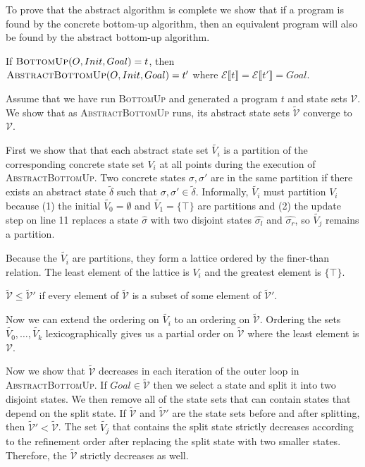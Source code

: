 \documentclass[review]{acmart}
\newcommand{\abs}[1]{\ensuremath{\widetilde{#1}}}
\renewcommand{\eval}[1]{\ensuremath{\mathcal{E}\llbracket#1\rrbracket}}
\begin{document}
To prove that the abstract algorithm is complete we show that if a program is
found by the concrete bottom-up algorithm, then an equivalent program will also
be found by the abstract bottom-up algorithm.

\begin{theorem}
  If $\Call{BottomUp}{O, Init, Goal} = t$, then $\Call{AbstractBottomUp}{O,
    Init, Goal} = t'$ where $\eval{t} = \eval{t'} = Goal$.
\end{theorem}

Assume that we have run \textsc{BottomUp} and generated a program $t$ and state
sets $\mathcal{V}$. We show that as \textsc{AbstractBottomUp} runs, its abstract
state sets $\abs{\mathcal{V}}$ converge to $\mathcal{V}$.

First we show that that each abstract state set $\abs{V_i}$ is a partition of
the corresponding concrete state set $V_i$ at all points during the execution of
\textsc{AbstractBottomUp}. Two concrete states $\sigma, \sigma'$ are in the same
partition if there exists an abstract state $\abs{\delta}$ such that $\sigma,
\sigma' \in \abs{\delta}$. Informally, $\abs{V_i}$ must partition $V_i$ because
(1) the initial $\abs{V_0} = \emptyset$ and $\abs{V_1} = \{\top\}$ are
partitions and (2) the update step on line 11 replaces a state $\hat{\sigma}$
with two disjoint states $\hat{\sigma_l}$ and $\hat{\sigma_r}$, so $\abs{V_j}$
remains a partition.

Because the $\abs{V_i}$ are partitions, they form a lattice ordered by the
finer-than relation. The least element of the lattice is $V_i$ and the greatest
element is $\{\top\}$.

\begin{definition}
  $\abs{\mathcal{V}} \leq \abs{\mathcal{V}}'$ if every element of
  $\abs{\mathcal{V}}$ is a subset of some element of $\abs{\mathcal{V}}'$.
\end{definition}

Now we can extend the ordering on $\abs{V_i}$ to an ordering on
$\abs{\mathcal{V}}$. Ordering the sets $\abs{V_0}, \dots, \abs{V_k}$
lexicographically gives us a partial order on $\abs{\mathcal{V}}$ where the
least element is $\mathcal{V}$.

Now we show that $\abs{\mathcal{V}}$ decreases in each iteration of the outer
loop in \textsc{AbstractBottomUp}. If $Goal \in \abs{\mathcal{V}}$ then we
select a state and split it into two disjoint states. We then remove all of the
state sets that can contain states that depend on the split state. If
$\abs{\mathcal{V}}$ and $\abs{\mathcal{V}}'$ are the state sets before and after
splitting, then $\abs{\mathcal{V}}' < \abs{\mathcal{V}}$. The set $\abs{V_j}$
that contains the split state strictly decreases according to the refinement
order after replacing the split state with two smaller states. Therefore, the
$\abs{\mathcal{V}}$ strictly decreases as well.
\end{document}
